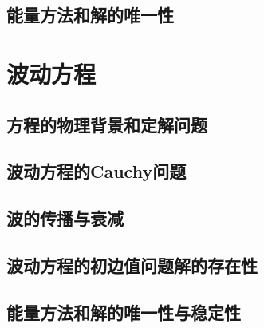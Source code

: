 \documentclass[a4paper, openright]{ctexbook}
\begin{document}
		\section{能量方法和解的唯一性}
	\chapter{波动方程}
		\section{方程的物理背景和定解问题}
		\section{波动方程的Cauchy问题}
		\section{波的传播与衰减}
		\section{波动方程的初边值问题解的存在性}
		\section{能量方法和解的唯一性与稳定性}
\end{document}
